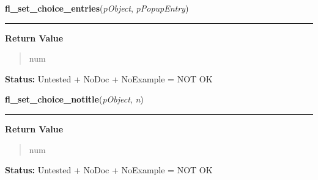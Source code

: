     \label{xformslib:library:fl_set_choice_entries}

    \vspace{0.5ex}

\hspace{.8\funcindent}\begin{boxedminipage}{\funcwidth}

    \raggedright \textbf{fl\_set\_choice\_entries}(\textit{pObject}, \textit{pPopupEntry})

    \vspace{-1.5ex}

    \rule{\textwidth}{0.5\fboxrule}
\setlength{\parskip}{2ex}
\setlength{\parskip}{1ex}
      \textbf{Return Value}
    \vspace{-1ex}

      \begin{quote}
      num

      \end{quote}

\textbf{Status:} Untested + NoDoc + NoExample = NOT OK



    \end{boxedminipage}

    \label{xformslib:library:fl_set_choice_notitle}

    \vspace{0.5ex}

\hspace{.8\funcindent}\begin{boxedminipage}{\funcwidth}

    \raggedright \textbf{fl\_set\_choice\_notitle}(\textit{pObject}, \textit{n})

    \vspace{-1.5ex}

    \rule{\textwidth}{0.5\fboxrule}
\setlength{\parskip}{2ex}
\setlength{\parskip}{1ex}
      \textbf{Return Value}
    \vspace{-1ex}

      \begin{quote}
      num

      \end{quote}

\textbf{Status:} Untested + NoDoc + NoExample = NOT OK



    \end{boxedminipage}

